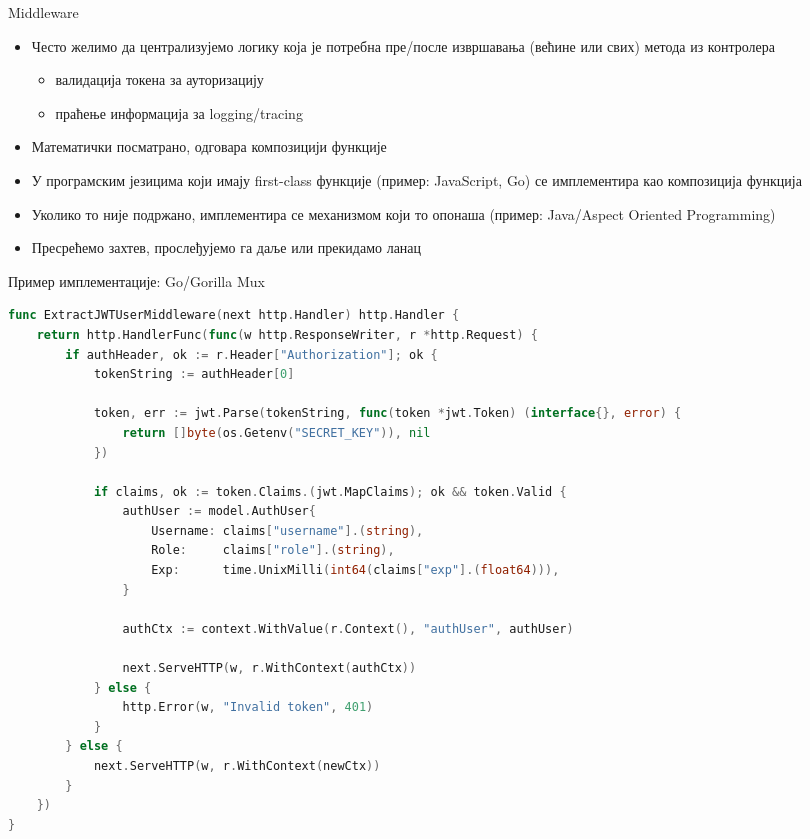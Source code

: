 \documentclass{beamer}
\begin{document}
    \begin{frame}{Middleware}
        \begin{itemize}
            \item Често желимо да централизујемо логику која је потребна пре/после извршавања (већине или свих) метода из контролера
            \begin{itemize}
                \item валидација токена за ауторизацију
                \item праћење информација за logging/tracing
            \end{itemize}
            \item Математички посматрано, одговара композицији функције
            \item У програмским језицима који имају first-class функције (пример: JavaScript, Go) се имплементира као композиција функција
            \item Уколико то није подржано, имплементира се механизмом који то опонаша (пример: Java/Aspect Oriented Programming)
            \item Пресрећемо захтев, прослеђујемо га даље или прекидамо ланац
        \end{itemize}
    \end{frame}
    
    \begin{frame}[fragile]{Пример имплементације: Go/Gorilla Mux}
        \begin{adjustbox}{width=\textwidth,height=0.7\textheight,keepaspectratio}
            \begin{lstlisting}[language=go]
func ExtractJWTUserMiddleware(next http.Handler) http.Handler {
    return http.HandlerFunc(func(w http.ResponseWriter, r *http.Request) {
        if authHeader, ok := r.Header["Authorization"]; ok {
            tokenString := authHeader[0]

            token, err := jwt.Parse(tokenString, func(token *jwt.Token) (interface{}, error) {
                return []byte(os.Getenv("SECRET_KEY")), nil
            })

            if claims, ok := token.Claims.(jwt.MapClaims); ok && token.Valid {
                authUser := model.AuthUser{
                    Username: claims["username"].(string),
                    Role:     claims["role"].(string),
                    Exp:      time.UnixMilli(int64(claims["exp"].(float64))),
                }

                authCtx := context.WithValue(r.Context(), "authUser", authUser)

                next.ServeHTTP(w, r.WithContext(authCtx))
            } else {
                http.Error(w, "Invalid token", 401)
            }
        } else {
            next.ServeHTTP(w, r.WithContext(newCtx))
        }
    })
}
            \end{lstlisting}
        \end{adjustbox}
    \end{frame}
    
\end{document}
